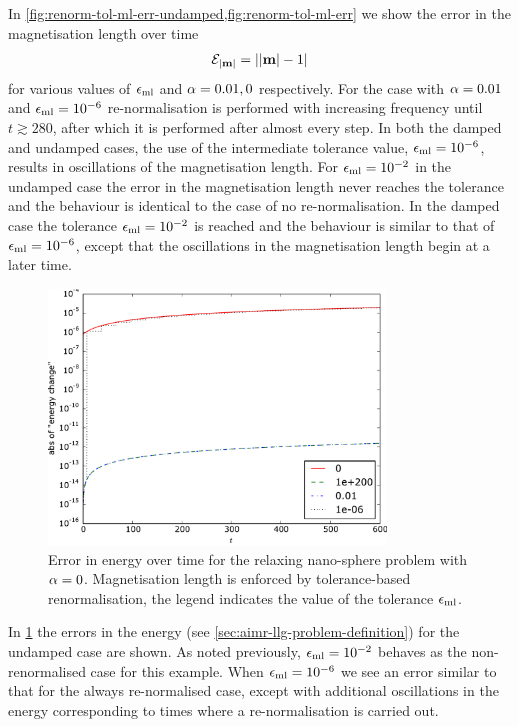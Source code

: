 In \cref{fig:renorm-tol-ml-err-undamped,fig:renorm-tol-ml-err} we show the error in the magnetisation length over time
\begin{equation}
  \mathcal{E}_{\left|{\boldsymbol{\mathrm{m}}} \right|} = \left|{\left|{\boldsymbol{\mathrm{m}}} \right| - 1} \right|
\end{equation}
for various values of $\epsilon_{\mathrm{ml}}$ and $\alpha=0.01, 0$ respectively.
For the case with $\alpha = 0.01$ and $\epsilon_{\mathrm{ml}} = 10^{-6}$ re-normalisation is performed with increasing frequency until $t \gtrsim 280$, after which it is performed after almost every step.
In both the damped and undamped cases, the use of the intermediate tolerance value, $\epsilon_{\mathrm{ml}} = 10^{-6}$, results in oscillations of the magnetisation length.
For $\epsilon_{\mathrm{ml}} = 10^{-2}$ in the undamped case the error in the magnetisation length never reaches the tolerance and the behaviour is identical to the case of no re-normalisation.
In the damped case the tolerance $\epsilon_{\mathrm{ml}} = 10^{-2}$ is reached and the behaviour is similar to that of $\epsilon_{\mathrm{ml}} = 10^{-6}$, except that the oscillations in the magnetisation length begin at a later time.


\begin{figure}
  \centering
  \includegraphics[width=0.8\textwidth]{plots/tolrenorm-geom-properties/0-absofenergychangevstimes.pdf}
  \caption{
    Error in energy over time
    for the relaxing nano-sphere problem
    with $\alpha = 0$.
    Magnetisation length is enforced by tolerance-based renormalisation,
    the legend indicates the value of the tolerance $\epsilon_{\mathrm{ml}}$.
  }
  \label{fig:renorm-tol-energy-err}
\end{figure}

In \cref{fig:renorm-tol-energy-err} the errors in the energy (see \cref{sec:aimr-llg-problem-definition}) for the undamped case are shown.
As noted previously, $\epsilon_{\mathrm{ml}}= 10^{-2}$ behaves as the non-renormalised case for this example.
When $\epsilon_{\mathrm{ml}} = 10^{-6}$ we see an error similar to that for the always re-normalised case, except with additional oscillations in the energy corresponding to times where a re-normalisation is carried out.


